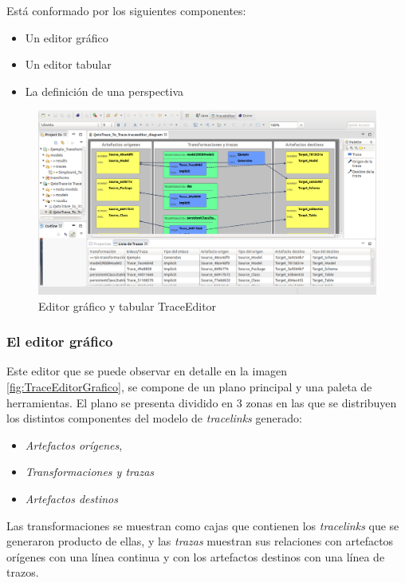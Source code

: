 \documentclass[a4paper,12pt,oneside,spanish]{book}
\begin{document}
Está conformado por los siguientes componentes:

\begin{itemize}
\item Un editor gráfico
\item Un editor tabular
\item La definición de una perspectiva 
\end{itemize}


\begin{figure}[hbtp]
\centering
\includegraphics[scale=.29]{./img/TraceEditorEjemplo}
\caption{Editor gráfico y tabular TraceEditor}
\label{fig:TraceEditorEjemplo}
\end{figure}


\subsubsection{El editor gráfico}

Este editor que se puede observar en detalle en la imagen \ref{fig:TraceEditorGrafico}, se compone de un plano principal y una paleta de herramientas. El plano se presenta dividido en 3 zonas en las que se distribuyen los distintos componentes del modelo de \textit{tracelinks} generado:

\begin{itemize}
\item \textsf{\textit{Artefactos orígenes}}, 
\item \textsf{\textit{Transformaciones y trazas}}
\item \textsf{\textit{Artefactos destinos}} 
\end{itemize} 

Las transformaciones se muestran como cajas que contienen los \textit{tracelinks} que se generaron producto de ellas, y las \textit{trazas} muestran sus relaciones con artefactos orígenes con una línea continua y con los artefactos destinos con una línea de trazos.
\end{document}
